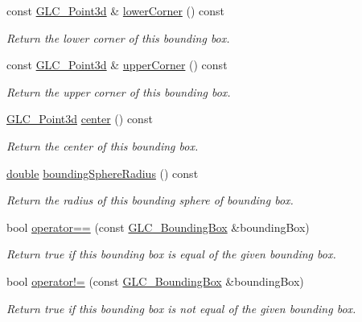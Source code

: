 \begin{DoxyCompactItemize}
const \hyperlink{glc__vector3d_8h_a4e13a9bbc7ab3d34de7e98b41836772c}{G\-L\-C\-\_\-\-Point3d} \& \hyperlink{class_g_l_c___bounding_box_aab6f082d850b5d7620b4383f47982a3f}{lower\-Corner} () const 
\begin{DoxyCompactList}\small\item\em Return the lower corner of this bounding box. \end{DoxyCompactList}\item 
const \hyperlink{glc__vector3d_8h_a4e13a9bbc7ab3d34de7e98b41836772c}{G\-L\-C\-\_\-\-Point3d} \& \hyperlink{class_g_l_c___bounding_box_a9bacc6c16aa87566c0bd841c65c9ebe6}{upper\-Corner} () const 
\begin{DoxyCompactList}\small\item\em Return the upper corner of this bounding box. \end{DoxyCompactList}\item 
\hyperlink{glc__vector3d_8h_a4e13a9bbc7ab3d34de7e98b41836772c}{G\-L\-C\-\_\-\-Point3d} \hyperlink{class_g_l_c___bounding_box_ae19afc3d0fa8ee78980564d9517a1a71}{center} () const 
\begin{DoxyCompactList}\small\item\em Return the center of this bounding box. \end{DoxyCompactList}\item 
\hyperlink{_super_l_u_support_8h_a8956b2b9f49bf918deed98379d159ca7}{double} \hyperlink{class_g_l_c___bounding_box_a11bf170646ea52a69c61a78161ee2469}{bounding\-Sphere\-Radius} () const 
\begin{DoxyCompactList}\small\item\em Return the radius of this bounding sphere of bounding box. \end{DoxyCompactList}\item 
bool \hyperlink{class_g_l_c___bounding_box_ab01b90408999c5f1f720c232eab2b79f}{operator==} (const \hyperlink{class_g_l_c___bounding_box}{G\-L\-C\-\_\-\-Bounding\-Box} \&bounding\-Box)
\begin{DoxyCompactList}\small\item\em Return true if this bounding box is equal of the given bounding box. \end{DoxyCompactList}\item 
bool \hyperlink{class_g_l_c___bounding_box_ab366fe2991838415e27f364a77b9d659}{operator!=} (const \hyperlink{class_g_l_c___bounding_box}{G\-L\-C\-\_\-\-Bounding\-Box} \&bounding\-Box)
\begin{DoxyCompactList}\small\item\em Return true if this bounding box is not equal of the given bounding box. \end{DoxyCompactList}\item 

\end{DoxyCompactItemize}
